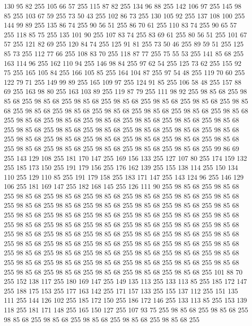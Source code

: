 130 95 82 255 105 66 57 255 115 87 82 255 134 96 88 255 142 106 97 255 145 98 85 255 103 67 59 255 73 50 43 255 102 86 73 255 130 105 92 255 137 108 100 255 144 99 89 255 135 86 74 255 90 56 51 255 86 70 61 255 110 83 74 255 90 65 57 255 118 85 75 255 135 101 90 255 107 83 74 255 83 69 61 255 80 56 51 255 101 67 57 255 121 82 69 255 120 84 74 255 125 91 81 255 73 50 46 255 89 59 51 255 125 85 73 255 112 77 66 255 108 83 70 255 118 87 77 255 75 55 53 255 141 85 68 255 163 114 96 255 162 110 94 255 146 98 84 255 97 62 54 255 125 73 62 255 155 92 75 255 165 105 84 255 166 105 85 255 164 104 87 255 97 54 48 255 119 70 60 255 122 79 71 255 149 99 89 255 165 109 97 255 124 91 85 255 106 58 48 255 157 88 69 255 163 98 80 255 163 103 89 255 119 87 79 255 111 98 92 255 98 85 68 255 98 85 68 255 98 85 68 255 98 85 68 255 98 85 68 255 98 85 68 255 98 85 68 255 98 85 68 255 98 85 68 255
98 85 68 255 98 85 68 255 98 85 68 255 98 85 68 255 98 85 68 255 98 85 68 255 98 85 68 255 98 85 68 255 98 85 68 255 98 85 68 255 98 85 68 255 98 85 68 255 98 85 68 255 98 85 68 255 98 85 68 255 98 85 68 255 98 85 68 255 98 85 68 255 98 85 68 255 98 85 68 255 98 85 68 255 98 85 68 255 98 85 68 255 98 85 68 255 98 85 68 255 98 85 68 255 98 85 68 255 98 85 68 255 99 86 69 255 143 129 108 255 181 170 147 255 169 156 133 255 127 107 80 255 174 159 132 255 185 173 150 255 191 179 156 255 176 162 139 255 155 138 114 255 150 134 110 255 129 110 85 255 191 179 158 255 183 171 147 255 143 124 96 255 146 129 106 255 181 169 147 255 182 168 145 255 126 111 90 255 98 85 68 255 98 85 68 255 98 85 68 255 98 85 68 255 98 85 68 255 98 85 68 255 98 85 68 255 98 85 68 255 98 85 68 255 98 85 68 255 98 85 68 255 98 85 68 255 98 85 68 255 98 85 68 255 98 85 68 255 98 85 68 255 98 85 68 255
98 85 68 255 98 85 68 255 98 85 68 255 98 85 68 255 98 85 68 255 98 85 68 255 98 85 68 255 98 85 68 255 98 85 68 255 98 85 68 255 98 85 68 255 98 85 68 255 98 85 68 255 98 85 68 255 98 85 68 255 98 85 68 255 98 85 68 255 98 85 68 255 98 85 68 255 98 85 68 255 98 85 68 255 98 85 68 255 98 85 68 255 98 85 68 255 98 85 68 255 98 85 68 255 98 85 68 255 98 85 68 255 98 85 68 255 98 85 68 255 98 85 68 255 98 85 68 255 98 85 68 255 98 85 68 255 98 85 68 255 98 85 68 255 98 85 68 255 98 85 68 255 101 88 70 255 152 138 117 255 180 169 147 255 149 135 113 255 133 113 85 255 185 172 147 255 188 175 153 255 177 163 142 255 171 157 133 255 155 137 112 255 151 135 111 255 144 126 102 255 185 172 150 255 186 172 146 255 133 113 85 255 153 139 118 255 181 171 148 255 165 150 127 255 107 93 75 255 98 85 68 255 98 85 68 255 98 85 68 255 98 85 68 255 98 85 68 255 98 85 68 255 98 85 68 255
